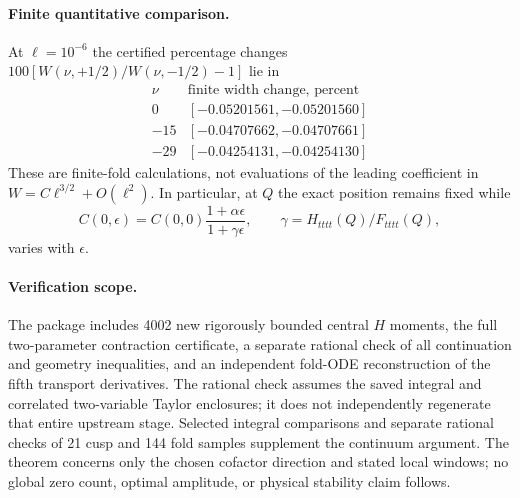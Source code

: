 \paragraph{Finite quantitative comparison.}
At $\ell=10^{-6}$ the certified percentage changes
$100[W(\nu,+1/2)/W(\nu,-1/2)-1]$ lie in
\[
\begin{array}{c|c}
 \nu & \text{finite width change, percent}\\ \hline
 0 & [-0.05201561,-0.05201560]\\
 -15 & [-0.04707662,-0.04707661]\\
 -29 & [-0.04254131,-0.04254130]
\end{array}
\]
These are finite-fold calculations, not evaluations of the
leading coefficient in $W=C\ell^{3/2}+O(\ell^2)$.
In particular, at $Q$ the exact position remains fixed while
\[
 C(0,\epsilon)=C(0,0)
 \frac{1+\alpha\epsilon}{1+\gamma\epsilon},
 \qquad
 \gamma=H_{tttt}(Q)/F_{tttt}(Q),
\]
varies with $\epsilon$.

\paragraph{Verification scope.}
The package includes 4002 new rigorously bounded central $H$ moments,
the full two-parameter contraction certificate, a separate rational
check of all continuation and geometry inequalities, and an
independent fold-ODE reconstruction of the fifth transport derivatives.
The rational check assumes the saved integral and correlated
two-variable Taylor enclosures; it does not independently regenerate
that entire upstream stage. Selected integral comparisons and
separate rational checks of 21 cusp and 144 fold samples supplement
the continuum argument. The theorem concerns only the chosen
cofactor direction and stated local windows; no global zero count,
optimal amplitude, or physical stability claim follows.

